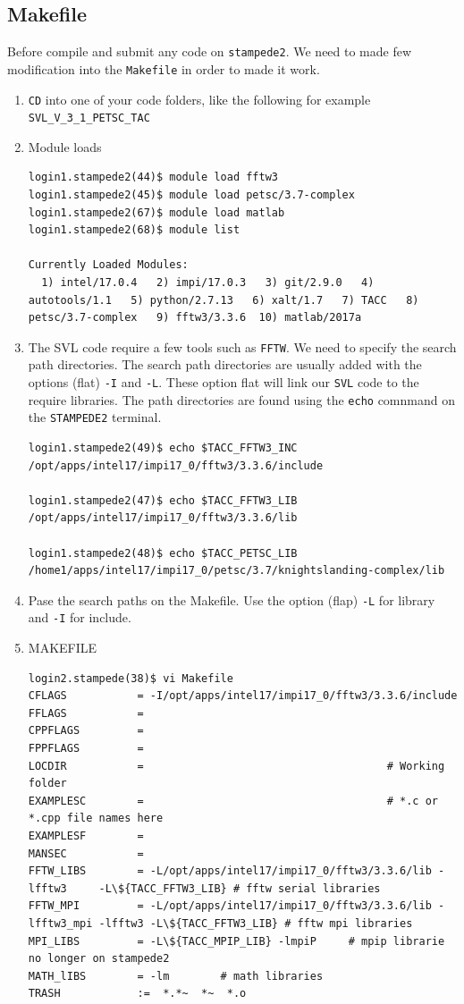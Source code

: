 \documentclass{article}
\begin{document}
\subsection{Makefile}
Before compile and submit any code on \verb+stampede2+. We need to made few modification into the  \verb+Makefile+ in order to made it work.
\begin{enumerate}
\item \verb+CD+ into one of your code folders, like the following for example \verb+SVL_V_3_1_PETSC_TAC+
\item Module loads
\scriptsize
\begin{verbatim}
login1.stampede2(44)$ module load fftw3
login1.stampede2(45)$ module load petsc/3.7-complex
login1.stampede2(67)$ module load matlab
login1.stampede2(68)$ module list

Currently Loaded Modules:
  1) intel/17.0.4   2) impi/17.0.3   3) git/2.9.0   4) autotools/1.1   5) python/2.7.13   6) xalt/1.7   7) TACC   8) petsc/3.7-complex   9) fftw3/3.3.6  10) matlab/2017a

\end{verbatim}
\normalsize
\item The SVL code require a few tools such as \verb+FFTW+.  
We need to specify the search path directories. The search path directories are usually added with the options (flat) \verb+-I+ and \verb+-L+.
These option flat will link our \verb+SVL+ code to the require libraries. The path directories are found using the \verb+echo+ comnmand on the \verb+STAMPEDE2+ terminal.
\scriptsize
\begin{verbatim}
login1.stampede2(49)$ echo $TACC_FFTW3_INC
/opt/apps/intel17/impi17_0/fftw3/3.3.6/include

login1.stampede2(47)$ echo $TACC_FFTW3_LIB
/opt/apps/intel17/impi17_0/fftw3/3.3.6/lib

login1.stampede2(48)$ echo $TACC_PETSC_LIB
/home1/apps/intel17/impi17_0/petsc/3.7/knightslanding-complex/lib
\end{verbatim}
\normalsize
\item Pase the search paths on the Makefile. Use the option (flap) \verb+-L+  for library and \verb+-I+ for include. 
\item MAKEFILE
\scriptsize
\begin{verbatim}
login2.stampede(38)$ vi Makefile 
CFLAGS           = -I/opt/apps/intel17/impi17_0/fftw3/3.3.6/include
FFLAGS           =
CPPFLAGS         =
FPPFLAGS         =
LOCDIR           =                                      # Working folder
EXAMPLESC        =                                      # *.c or *.cpp file names here
EXAMPLESF        =
MANSEC           =
FFTW_LIBS        = -L/opt/apps/intel17/impi17_0/fftw3/3.3.6/lib -lfftw3     -L\${TACC_FFTW3_LIB} # fftw serial libraries
FFTW_MPI         = -L/opt/apps/intel17/impi17_0/fftw3/3.3.6/lib -lfftw3_mpi -lfftw3 -L\${TACC_FFTW3_LIB} # fftw mpi libraries
MPI_LIBS         = -L\${TACC_MPIP_LIB} -lmpiP     # mpip librarie no longer on stampede2
MATH_lIBS        = -lm        # math libraries
TRASH            :=  *.*~  *~  *.o


\end{verbatim}
\end{enumerate}
\end{document}
